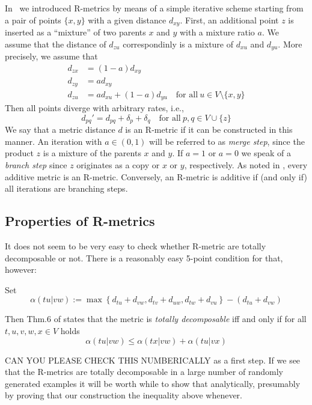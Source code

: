 \documentclass{article}
\newcommand{\TODO}[1]{\begingroup\color{red}#1\endgroup}
\begin{document}
In~\cite{Prohaska:17a} we introduced R-metrics by means of a simple
iterative scheme starting from a pair of points $\{x,y\}$ with a given
distance $d_{xy}$.  First, an additional point $z$ is inserted as a
``mixture'' of two parents $x$ and $y$ with a mixture ratio $a$. We assume
that the distance of $d_{zu}$ correspondinly is a mixture of $d_{xu}$ and
$d_{yu}$. More precisely, we assume that
\begin{equation} 
\begin{split} 
  d_{zx} & = (1-a)  d_{xy} \\
  d_{zy} & =   a    d_{xy} \\
  d_{zu} & =   a    d_{xu} + (1-a)  d_{yu} \quad\textrm{for all}\ 
                     u\in V\setminus\{ x,y \}
\end{split}
\end{equation} 
Then all points diverge with arbitrary rates, i.e., 
\begin{equation} 
  d_{pq}' = d_{pq} + \delta_p + \delta_q \quad\textrm{for all}\ 
  p,q \in V\cup\{z\} 
\end{equation} 
We say that a metric distance $d$ is an R-metric if it can be constructed
in this manner. An iteration with $a\in(0,1)$ will be referred to as
\emph{merge step}, since the product $z$ is a mixture of the parents $x$
and $y$. If $a=1$ or $a=0$ we speak of a \emph{branch step} since $z$
originates as a copy or $x$ or $y$, respectively. As noted in
\cite{Prohaska:17a}, every additive metric is an R-metric. Conversely, an
R-metric is additive if (and only if) all iterations are branching steps.

\subsection*{Properties of R-metrics} 


\TODO{It does not seem to be very easy to check whether R-metric are 
totally decomposable or not. There is a reasonably easy 5-point condition
for that, however:

Set 
\begin{equation} 
  \alpha(tu|vw) := 
  \max\left\{ d_{tu}+d_{vw}, d_{tv}+d_{uw}, d_{tw}+d_{vu} \right\} -
             (d_{tu}+d_{vw})
\end{equation} 

Then Thm.6 of \cite{Bandelt:92} states that the metric is \emph{totally
  decomposable} iff and only if for all $t,u,v,w,x\in V$ holds 
\begin{equation} 
  \alpha(tu|vw) \le \alpha(tx|vw)+\alpha(tu|vx)
\end{equation} 

CAN YOU PLEASE CHECK THIS NUMBERICALLY as a first step. If we see that the 
R-metrics are totally decomposable in a large number of randomly generated
examples it will be worth while to show that analytically, presumably by 
proving that our construction the inequality above whenever.
}
\end{document}

